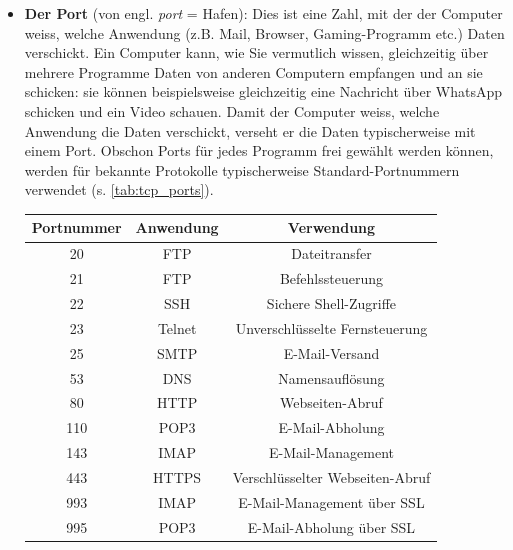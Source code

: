 \begin{itemize}
	\item \textbf{Der Port} (von engl. \textit{port} = Hafen): Dies ist eine Zahl, mit der der Computer weiss, welche Anwendung (z.B. Mail, Browser, Gaming-Programm etc.) Daten verschickt. Ein Computer kann, wie Sie vermutlich wissen, gleichzeitig über mehrere Programme Daten von anderen Computern empfangen und an sie schicken: sie können beispielsweise gleichzeitig eine Nachricht über WhatsApp schicken und ein Video schauen. Damit der Computer weiss, welche Anwendung die Daten verschickt, verseht er die Daten typischerweise mit einem Port. Obschon Ports für jedes Programm frei gewählt werden können, werden für bekannte Protokolle typischerweise Standard-Portnummern verwendet (s. \cref{tab:tcp_ports}).
	      \begin{table}[H]
		      \centering
		      \begin{tabular}{ccc}
			      \toprule
			      \textbf{Portnummer} & \textbf{Anwendung} & \textbf{Verwendung}                   \\
			      \midrule
			      20                  & \acrfull{FTP}      & Dateitransfer                         \\
			      21                  & \acrfull{FTP}      & Befehlssteuerung                      \\
			      22                  & \acrfull{SSH}      & Sichere Shell-Zugriffe                \\
			      23                  & Telnet             & Unverschlüsselte Fernsteuerung        \\
			      25                  & \acrfull{SMTP}     & E-Mail-Versand                        \\
			      53                  & \acrfull{DNS}      & Namensauflösung                       \\
			      80                  & \acrfull{HTTP}     & Webseiten-Abruf                       \\
			      110                 & \acrfull{POP3}     & E-Mail-Abholung                       \\
			      143                 & \acrfull{IMAP}     & E-Mail-Management                     \\
			      443                 & \acrfull{HTTPS}    & Verschlüsselter Webseiten-Abruf       \\
			      993                 & \acrfull{IMAP}     & E-Mail-Management über \acrshort{SSL} \\
			      995                 & \acrfull{POP3}     & E-Mail-Abholung über \acrshort{SSL}   \\

\end{tabular}
\end{table}
\end{itemize}
